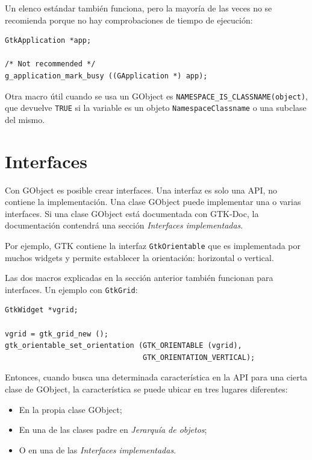 Un elenco estándar también funciona, pero la mayoría de las veces no se recomienda porque no hay comprobaciones de tiempo de ejecución:
\begin{lstlisting}
GtkApplication *app;

/* Not recommended */
g_application_mark_busy ((GApplication *) app);
\end{lstlisting}

Otra macro útil cuando se usa un GObject es \lstinline{NAMESPACE_IS_CLASSNAME(object)}, que devuelve \lstinline{TRUE} si la variable es un objeto \lstinline{NamespaceClassname} o una subclase del mismo.


\section{Interfaces}

Con GObject es posible crear interfaces. Una interfaz es solo una API, no contiene la implementación. Una clase GObject puede implementar una o varias interfaces. Si una clase GObject está documentada con GTK-Doc, la documentación contendrá una sección \emph{Interfaces implementadas}.

Por ejemplo, GTK contiene la interfaz \lstinline{GtkOrientable} que es implementada por muchos widgets y permite establecer la orientación: horizontal o vertical.

Las dos macros explicadas en la sección anterior también funcionan para interfaces. Un ejemplo con \lstinline{GtkGrid}:
\begin{lstlisting}
GtkWidget *vgrid;

vgrid = gtk_grid_new ();
gtk_orientable_set_orientation (GTK_ORIENTABLE (vgrid),
                                GTK_ORIENTATION_VERTICAL);
\end{lstlisting}

Entonces, cuando busca una determinada característica en la API para una cierta clase de GObject, la característica se puede ubicar en tres lugares diferentes:
\begin{itemize}
    \item En la propia clase GObject;
    \item En una de las clases padre en \emph{Jerarquía de objetos};
    \item O en una de las \emph{Interfaces implementadas}.
\end{itemize}

